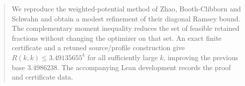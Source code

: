 \begin{abstract}
We reproduce the weighted-potential method of Zhao, Booth-Clibborn and
Schwahn and obtain a modest refinement of their diagonal Ramsey bound.
The complementary moment inequality reduces the set of feasible
retained fractions without changing the optimizer on that set.
An exact finite certificate and a retuned source/profile construction
give $R(k,k)\le3.49135655^k$ for all sufficiently large $k$, improving
the previous base $3.4986238$. The accompanying Lean development records
the proof and certificate data.
\end{abstract}

